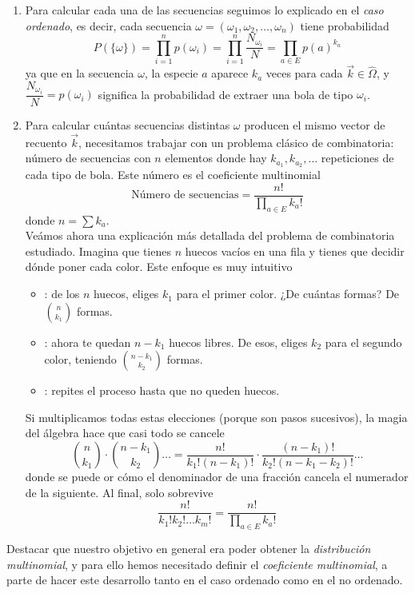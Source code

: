 \begin{enumerate}[label=\arabic*)]
    \item Para calcular cada una de las secuencias seguimos lo explicado en el \textit{caso ordenado}, es decir, cada secuencia $\omega=(\omega_1, \omega_2, \ldots, \omega_n)$ tiene probabilidad
    \begin{equation*}
        P(\{\omega\}) = \prod_{i=1}^n p(\omega_i) =\prod_{i=1}^{n} \dfrac{N_{\omega_i}}{N}= \prod_{a\in E} p(a)^{k_a}
    \end{equation*}
    ya que en la secuencia $\omega$, la especie $a$ aparece $k_a$ veces para cada $\vec{k} \in \hat{\Omega}$, y $\dfrac{N_{\omega_i}}{N} = p(\omega_i)$ significa la probabilidad de extraer una bola de tipo $\omega_i$.
    \item Para calcular cuántas secuencias distintas $\omega$ producen el mismo vector de recuento $\vec{k}$, necesitamos trabajar con un problema clásico de combinatoria: número de secuencias con $n$ elementos donde hay $k_{a_1}, k_{a_2}, \dots$ repeticiones de cada tipo de bola. Este número es el coeficiente multinomial
    $$\text{Número de secuencias} = \frac{n!}{\prod_{a \in E} k_a!}$$
    donde $n = \sum k_a$. \\
    \noindent
    Veámos ahora una explicación más detallada del problema de combinatoria estudiado. Imagina que tienes $n$ huecos vacíos en una fila y tienes que decidir dónde poner cada color. Este enfoque es muy intuitivo
    \begin{itemize}
        \item {}: de los $n$ huecos, eliges $k_1$ para el primer color. ¿De cuántas formas? De $\binom{n}{k_1}$ formas.
        \item {}: ahora te quedan $n - k_1$ huecos libres. De esos, eliges $k_2$ para el segundo color, teniendo $\binom{n - k_1}{k_2}$ formas.
        \item {}: repites el proceso hasta que no queden huecos.
    \end{itemize}
    Si multiplicamos todas estas elecciones (porque son pasos sucesivos), la magia del álgebra hace que casi todo se cancele
    \begin{equation*}
        \binom{n}{k_1} \cdot \binom{n-k_1}{k_2} \dots = \dfrac{n!}{k_1!(n-k_1)!} \cdot \dfrac{(n-k_1)!}{k_2!(n-k_1-k_2)!} \dots
    \end{equation*}
    donde se puede or cómo el denominador de una fracción cancela el numerador de la siguiente. Al final, solo sobrevive
    \begin{equation*}
        \dfrac{n!}{k_1! k_2! \dots k_m!}= \dfrac{n!}{\prod_{a \in E} k_a!}
    \end{equation*}
\end{enumerate}
Destacar que nuestro objetivo en general era poder obtener la \textit{distribución multinomial}, y para ello hemos necesitado definir el \textit{coeficiente multinomial}, a parte de hacer este desarrollo tanto en el caso ordenado como en el no ordenado. \\ 


